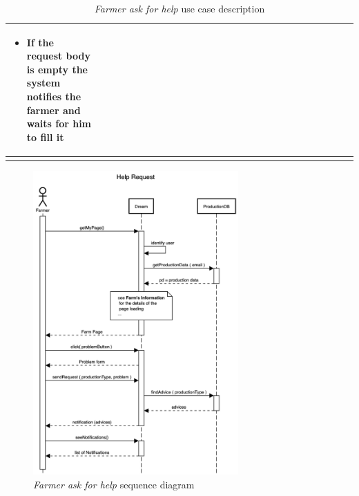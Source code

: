\begin{enumerate}
\begin{longtable}{p{0.26\linewidth}p{0.75\linewidth}}
\begin{itemize}
            \item If the request body is empty the system notifies the farmer and waits for him to fill it
        \end{itemize}\\
        \bottomrule
        \caption{\emph{Farmer ask for help} use case description}
    \end{longtable}
    \begin{figure}[H]
        \begin{center}
        \includegraphics[width=0.7\textwidth]{sequence/HelpRequest.png}
        \caption{\emph{Farmer ask for help} sequence diagram}
        \label{fig:sequence6}
        \end{center}
    \end{figure}


\end{enumerate}
